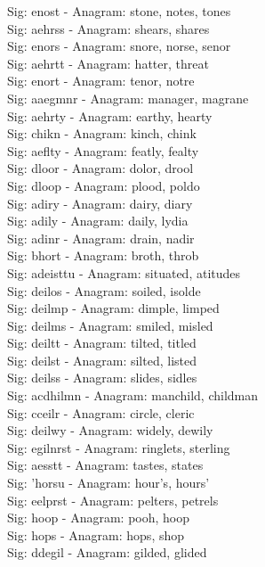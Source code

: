 Sig: {enost} - Anagram: stone, notes, tones \\
Sig: {aehrss} - Anagram: shears, shares \\
Sig: {enors} - Anagram: snore, norse, senor \\
Sig: {aehrtt} - Anagram: hatter, threat \\
Sig: {enort} - Anagram: tenor, notre \\
Sig: {aaegmnr} - Anagram: manager, magrane \\
Sig: {aehrty} - Anagram: earthy, hearty \\
Sig: {chikn} - Anagram: kinch, chink \\
Sig: {aeflty} - Anagram: featly, fealty \\
Sig: {dloor} - Anagram: dolor, drool \\
Sig: {dloop} - Anagram: plood, poldo \\
Sig: {adiry} - Anagram: dairy, diary \\
Sig: {adily} - Anagram: daily, lydia \\
Sig: {adinr} - Anagram: drain, nadir \\
Sig: {bhort} - Anagram: broth, throb \\
Sig: {adeisttu} - Anagram: situated, atitudes \\
Sig: {deilos} - Anagram: soiled, isolde \\
Sig: {deilmp} - Anagram: dimple, limped \\
Sig: {deilms} - Anagram: smiled, misled \\
Sig: {deiltt} - Anagram: tilted, titled \\
Sig: {deilst} - Anagram: silted, listed \\
Sig: {deilss} - Anagram: slides, sidles \\
Sig: {acdhilmn} - Anagram: manchild, childman \\
Sig: {cceilr} - Anagram: circle, cleric \\
Sig: {deilwy} - Anagram: widely, dewily \\
Sig: {egilnrst} - Anagram: ringlets, sterling \\
Sig: {aesstt} - Anagram: tastes, states \\
Sig: {'horsu} - Anagram: hour's, hours' \\
Sig: {eelprst} - Anagram: pelters, petrels \\
Sig: {hoop} - Anagram: pooh, hoop \\
Sig: {hops} - Anagram: hops, shop \\
Sig: {ddegil} - Anagram: gilded, glided \\
